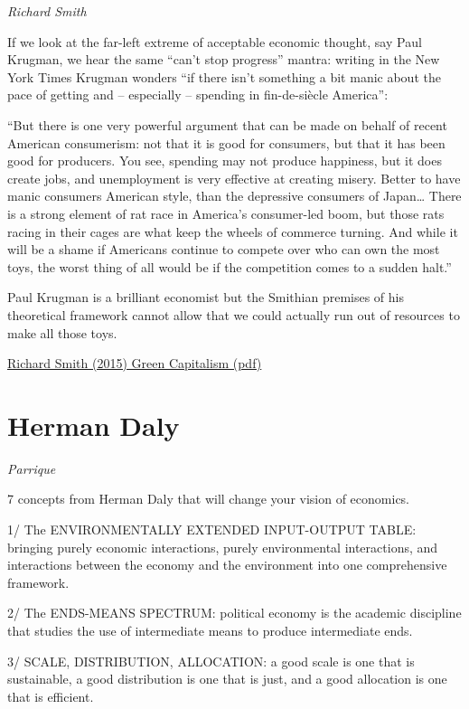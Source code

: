 \documentclass[
]{book}
\begin{document}
\emph{Richard Smith}

If we look at the far-left extreme of acceptable economic
thought, say Paul Krugman, we hear the same ``can't stop progress'' mantra: writing
in the New York Times Krugman wonders ``if there isn't something a bit manic about
the pace of getting and -- especially -- spending in fin-de-siècle America'':

``But there is one very powerful argument that can be made on
behalf of recent American consumerism: not that it is good for
consumers, but that it has been good for producers. You see,
spending may not produce happiness, but it does create jobs, and
unemployment is very effective at creating misery. Better to have
manic consumers American style, than the depressive consumers
of Japan\ldots{} There is a strong element of rat race in America's
consumer-led boom, but those rats racing in their cages are what
keep the wheels of commerce turning. And while it will be a
shame if Americans continue to compete over who can own the
most toys, the worst thing of all would be if the competition comes
to a sudden halt.''

Paul Krugman is a brilliant economist but the Smithian premises of his theoretical
framework cannot allow that we could actually run out of resources to make all
those toys.

\href{pdf/Richard_Smith_Green_Capitalism_the_God_that_Failed.pdf}{Richard Smith (2015) Green Capitalism (pdf)}

\hypertarget{herman-daly-1}{%
\section{Herman Daly}\label{herman-daly-1}}

\emph{Parrique}

7 concepts from Herman Daly that will change your vision of economics.

1/ The ENVIRONMENTALLY EXTENDED INPUT-OUTPUT TABLE: bringing purely economic interactions, purely environmental interactions, and interactions between the economy and the environment into one comprehensive framework.

2/ The ENDS-MEANS SPECTRUM: political economy is the academic discipline that studies the use of intermediate means to produce intermediate ends.

3/ SCALE, DISTRIBUTION, ALLOCATION: a good scale is one that is sustainable, a good distribution is one that is just, and a good allocation is one that is efficient.
\end{document}
